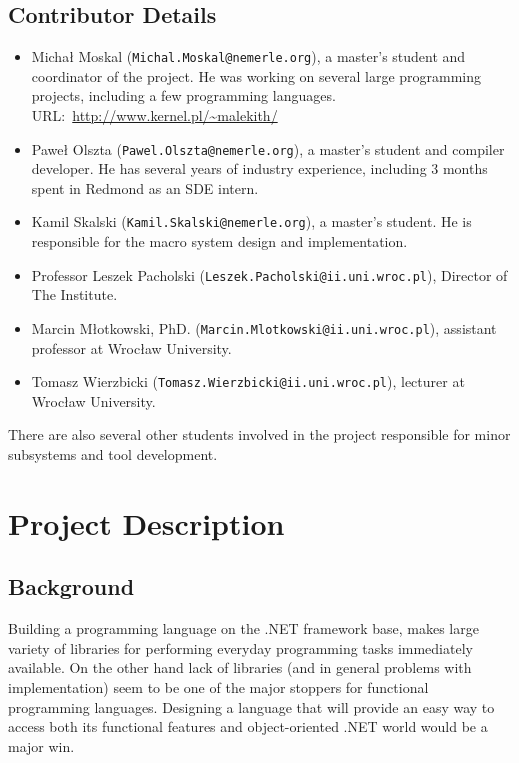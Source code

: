 \documentclass[a4paper,11pt]{article}
\begin{document}
\subsection{Contributor Details}
\begin{itemize}

\item
Micha{\l} Moskal (\texttt{Michal.Moskal@nemerle.org}), a master's
student and coordinator of the project. He was working on several large
programming projects, including a few programming languages.
URL:~\url{http://www.kernel.pl/~malekith/}

\item
Pawe{\l} Olszta (\texttt{Pawel.Olszta@nemerle.org}), a master's student
and compiler developer. He has several years of industry experience, 
including 3 months spent in Redmond as an SDE intern. 

\item
Kamil Skalski (\texttt{Kamil.Skalski@nemerle.org}), a master's student.
He is responsible for the macro system design and implementation.

\item
Professor Leszek Pacholski (\texttt{Leszek.Pacholski@ii.uni.wroc.pl}), 
Director of The Institute.

\item
Marcin M\l otkowski, PhD. (\texttt{Marcin.Mlotkowski@ii.uni.wroc.pl}), 
assistant professor at Wroc\l aw University.

\item
Tomasz Wierzbicki (\texttt{Tomasz.Wierzbicki@ii.uni.wroc.pl}), 
lecturer at Wroc\l aw University.

\end{itemize}

There are also several other students involved in the project
responsible for minor subsystems and tool development.


\section{Project Description}

\subsection{Background}
Building a programming language on the .NET framework base, makes large
variety of libraries for performing everyday programming tasks immediately
available. On the other hand lack of libraries (and in general problems
with implementation) seem to be one of the major stoppers for functional
programming languages. Designing a language that will provide an easy way
to access both its functional features and object-oriented .NET world
would be a major win.
\end{document}
